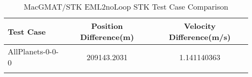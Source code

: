\begin{table}[htbp!]
\centering
\caption{ MacGMAT/STK EML2noLoop STK Test Case Comparison}
      \begin{tabular}{lcc}
      \hline\hline
          Test Case & Position Difference(m) & Velocity Difference(m/s) \\
         \hline
         AllPlanets-0-0-0 & 209143.2031 & 1.141140363 \\
      \hline\hline
      \label{Table: EML2noLoop STK Table} 
\end{tabular}
\end{table}

